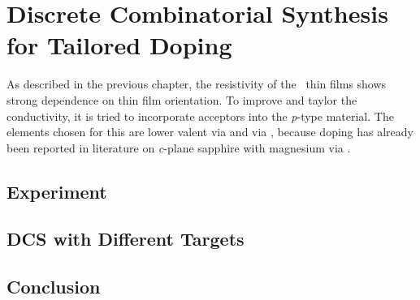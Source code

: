 \section{Discrete Combinatorial Synthesis for Tailored Doping}
    \label{Sec:Results_Doping}
As described in the previous chapter, the resistivity of the \cro\ thin films shows strong dependence on thin film orientation.
To improve and taylor the conductivity, it is tried to incorporate acceptors into the \textit{p}-type material.
The elements chosen for this are lower valent  via  and  via , because doping has already been reported in literature on \textit{c}-plane sapphire with magnesium via 
    \cite{farrell2015}.

\subsection{Experiment}
    
\subsection{DCS with Different Targets}
    
\subsection{Conclusion}
    